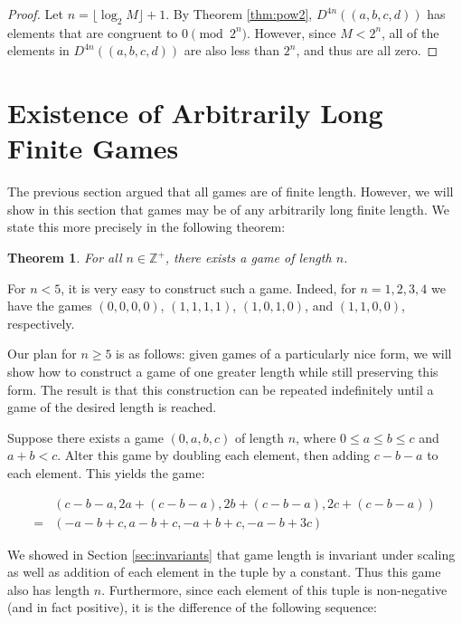 \documentclass[12pt]{amsart}
\newtheorem{theorem}{Theorem}[section]
\newcommand{\diff}{D}
\newcommand{\zp}{\mathbb{Z}^+}
\begin{document}
\begin{proof}
Let $n = \lfloor\log_2{M}\rfloor + 1$. By Theorem \ref {thm:pow2}, $\diff^{4n}((a, b, c, d))$ has elements that are congruent to $0\pmod{2^n}$. However, since $M < 2^n$, all of the elements in $\diff^{4n}((a, b, c, d))$ are also less than $2^n$, and thus are all zero.
\end{proof}

\section{Existence of Arbitrarily Long Finite Games\label{sec:longgames}}

The previous section argued that all games are of finite length. However, we will show in this section that games may be of any arbitrarily long finite length. We state this more precisely in the following theorem:

\begin{theorem}
For all $n\in \zp$, there exists a game of length $n$.
\end{theorem}

For $n < 5$, it is very easy to construct such a game. Indeed, for $n=1,2,3,4$ we have the games $(0, 0, 0, 0)$, $(1, 1, 1, 1)$, $(1, 0, 1, 0)$, and $(1, 1, 0, 0)$, respectively.

Our plan for $n \geq 5$ is as follows: given games of a particularly nice form, we will show how to construct a game of one greater length while still preserving this form. The result is that this construction can be repeated indefinitely until a game of the desired length is reached.

Suppose there exists a game $(0, a, b, c)$ of length $n$, where $0\leq a\leq b\leq c$ and $a + b < c$. Alter this game by doubling each element, then adding $c - b - a$ to each element. This yields the game:

$$\begin{array}{cl}
& (c - b - a, 2a + (c - b - a), 2b + (c - b - a), 2c + (c - b - a)) \\
= & (-a - b + c, a - b + c, -a + b + c, -a - b + 3c)
\end{array}$$

We showed in Section \ref{sec:invariants} that game length is invariant under scaling as well as addition of each element in the tuple by a constant. Thus this game also has length $n$. Furthermore, since each element of this tuple is non-negative (and in fact positive), it is the difference of the following sequence:
\end{document}
